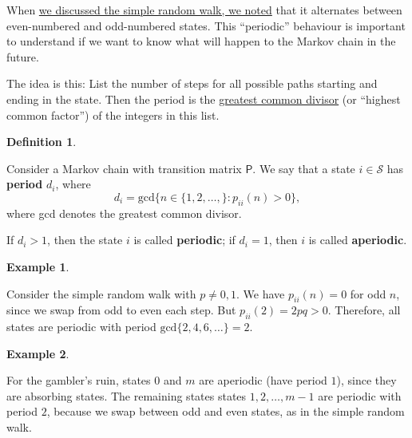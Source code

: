 \documentclass[
  a4paper,
]{article}
\theoremstyle{definition}
\newtheorem{definition}{Definition}[section]
\theoremstyle{definition}
\newtheorem{example}{Example}[section]
\theoremstyle{definition}
\theoremstyle{remark}
\begin{document}
When \protect\hyperlink{S02-exact-distribution}{we discussed the simple random walk, we noted} that it alternates between even-numbered and odd-numbered states. This ``periodic'' behaviour is important to understand if we want to know what will happen to the Markov chain in the future.

The idea is this: List the number of steps for all possible paths starting and ending in the state. Then the period is the \href{https://en.wikipedia.org/wiki/Greatest_common_divisor}{greatest common divisor} (or ``highest common factor'') of the integers in this list.

\begin{definition}
\protect\hypertarget{def:period}{}\label{def:period}

Consider a Markov chain with transition matrix \(\mathsf P\). We say that a state \(i\in\mathcal{S}\) has \textbf{period} \(d_i\), where
\[ d_i=\text{gcd}\big\{n\in\{1,2,\dots,\} : p_{ii}(n) > 0\big\} , \]
where gcd denotes the greatest common divisor.

If \(d_i>1\), then the state \(i\) is called \textbf{periodic}; if \(d_i = 1\), then \(i\) is called \textbf{aperiodic}.

\end{definition}

\begin{example}
\protect\hypertarget{exm:rw-period}{}\label{exm:rw-period}

Consider the simple random walk with \(p \neq 0,1\). We have \(p_{ii}(n) = 0\) for odd \(n\), since we swap from odd to even each step. But \(p_{ii}(2) = 2pq > 0\). Therefore, all states are periodic with period \(\text{gcd}\{2,4,6,\dots\} = 2\).

\end{example}

\begin{example}
\protect\hypertarget{exm:gamblers-period}{}\label{exm:gamblers-period}

For the gambler's ruin, states \(0\) and \(m\) are aperiodic (have period \(1\)), since they are absorbing states. The remaining states states \(1,2,\dots,m-1\) are periodic with period \(2\), because we swap between odd and even states, as in the simple random walk.

\end{example}
\end{document}
